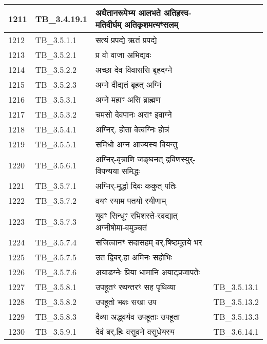 \documentclass[17pt]{extarticle}
\begin{document}
\begin{longtable}{||p{0.4in}||p{0.9in}||p{4.0in}||p{0.9in}||}
        \hline
            1211 & TB\_3.4.19.1 & अथैतानरूपेभ्य आलभते अतिह्रस्व{-}मतिदीर्घम् अतिकृशमत्यꣳसलम् &      \\
        \hline
            1212 & TB\_3.5.1.1 & सत्यं प्रपद्ये ऋतं प्रपद्ये &      \\
        \hline
            1213 & TB\_3.5.2.1 & प्र वो वाजा अभिद्यवः &      \\
        \hline
            1214 & TB\_3.5.2.2 & अच्छा देव विवाससि बृहदग्ने &      \\
        \hline
            1215 & TB\_3.5.2.3 & अग्ने दीद्यतं बृहत् अग्निं &      \\
        \hline
            1216 & TB\_3.5.3.1 & अग्ने महाꣳ असि ब्राह्मण &      \\
        \hline
            1217 & TB\_3.5.3.2 & चमसो देवपानः अराꣳ इवाग्ने &      \\
        \hline
            1218 & TB\_3.5.4.1 & अग्निर्. होता वेत्वग्निः होत्रं &      \\
        \hline
            1219 & TB\_3.5.5.1 & समिधो अग्न आज्यस्य वियन्तु &      \\
        \hline
            1220 & TB\_3.5.6.1 & अग्निर्{-}वृत्राणि जङ्घनत् द्रविणस्युर्{-}विपन्यया समिद्धः &      \\
        \hline
            1221 & TB\_3.5.7.1 & अग्निर्{-}मूर्द्धा दिवः ककुत् पतिः &      \\
        \hline
            1222 & TB\_3.5.7.2 & वयꣳ स्याम पतयो रयीणाम् &      \\
        \hline
            1223 & TB\_3.5.7.3 & युवꣳ सिन्धूꣳ रभिशस्ते{-}रवद्यात् अग्नीषोमा{-}वमुञ्चतं &      \\
        \hline
            1224 & TB\_3.5.7.4 & सजित्वानꣳ सदासहम् वर्.षिष्ठमूतये भर &      \\
        \hline
            1225 & TB\_3.5.7.5 & उत द्विबर्.हा अमिनः सहोभिः &      \\
        \hline
            1226 & TB\_3.5.7.6 & अयाडग्नेः प्रिया धामानि अयाट्प्रजापतेः &      \\
        \hline
            1227 & TB\_3.5.8.1 & उपहूतꣳ रथन्तरꣳ सह पृथिव्या &  TB\_3.5.13.1       \\
        \hline
            1228 & TB\_3.5.8.2 & उपहूतो भक्षः सखा उप &  TB\_3.5.13.2       \\
        \hline
            1229 & TB\_3.5.8.3 & दैव्या अद्ध्वर्यव उपहूताः उपहूता &  TB\_3.5.13.3       \\
        \hline
            1230 & TB\_3.5.9.1 & देवं बर्.हिः वसुवने वसुधेयस्य &  TB\_3.6.14.1       \\

\end{longtable}
\end{document}
